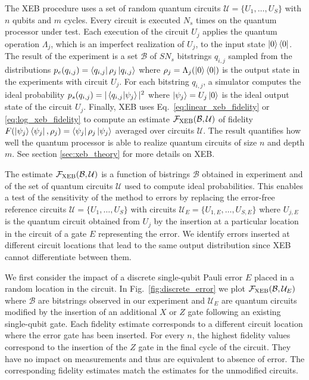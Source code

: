 The XEB procedure uses a set of random quantum circuits $\mathcal{U} = \{U_1, \dots, U_S\}$ with $n$ qubits and $m$ cycles. Every circuit is executed $N_s$ times on the quantum processor under test. Each execution of the circuit $U_j$ applies the quantum operation $\Lambda_j$, which is an imperfect realization of $U_j$, to the input state $\mathinner{|{0}\rangle}\mathinner{\langle{0}|}$. The result of the experiment is a set $\mathcal{B}$ of $S N_s$ bitstrings $q_{i,j}$ sampled from the distributions $p_e(q_{i,j}) = \mathinner{\langle{q_{i,j}}|} \rho_j \mathinner{|{q_{i,j}}\rangle}$ where $\rho_j = \Lambda_j(\mathinner{|{0}\rangle}\mathinner{\langle{0}|})$ is the output state in the experiments with circuit $U_j$. For each bitstring $q_{i,j}$, a simulator computes the ideal probability $p_s(q_{i,j}) = |\mathinner{\langle{q_{i,j}}|\psi_j \rangle}|^2$ where $\mathinner{|{\psi_j}\rangle} = U_j\mathinner{|{0}\rangle}$ is the ideal output state of the circuit $U_j$. Finally, XEB uses Eq.~\eqref{eq:linear_xeb_fidelity} or \eqref{eq:log_xeb_fidelity} to compute an estimate $\mathcal{F}_{\text{XEB}}(\mathcal{B}, \mathcal{U})$ of fidelity $F(\mathinner{|{\psi_j}\rangle}\mathinner{\langle{\psi_j}|}, \rho_j) = \mathinner{\langle{\psi_j}|}\rho_j\mathinner{|{\psi_j}\rangle}$ averaged over circuits $\mathcal{U}$. The result quantifies how well the quantum processor is able to realize quantum circuits of size $n$ and depth $m$. See section \ref{sec:xeb_theory} for more details on XEB.

The estimate $\mathcal{F}_{\text{XEB}}(\mathcal{B}, \mathcal{U})$ is a function of bistrings $\mathcal{B}$ obtained in experiment and of the set of quantum circuits $\mathcal{U}$ used to compute ideal probabilities. This enables a test of the sensitivity of the method to errors by replacing the error-free reference circuits $\mathcal{U} = \{U_1, \dots, U_S\}$ with circuits $\mathcal{U}_E = \{U_{1,E}, \dots, U_{S,E}\}$ where $U_{j,E}$ is the quantum circuit obtained from $U_j$ by the insertion at a particular location in the circuit of a gate $E$ representing the error. We identify errors inserted at different circuit locations that lead to the same output distribution since XEB cannot differentiate between them.

We first consider the impact of a discrete single-qubit Pauli error $E$ placed in a random location in the circuit. In Fig.~\ref{fig:discrete_error} we plot $\mathcal{F}_{\text{XEB}}(\mathcal{B}, \mathcal{U}_E)$ where $\mathcal{B}$ are bitstrings observed in our experiment and $\mathcal{U}_E$ are quantum circuits modified by the insertion of an additional $X$ or $Z$ gate following an existing single-qubit gate. Each fidelity estimate corresponds to a different circuit location where the error gate has been inserted. For every $n$, the highest fidelity values correspond to the insertion of the $Z$ gate in the final cycle of the circuit. They have no impact on measurements and thus are equivalent to absence of error. The corresponding fidelity estimates match the estimates for the unmodified circuits.

